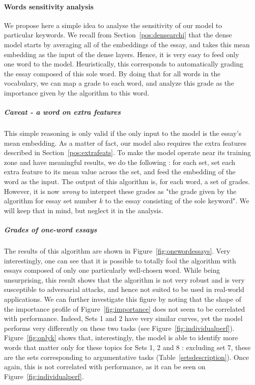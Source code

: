 \documentclass[a4paper,12pt,english]{article}
\begin{document}
\paragraph{Words sensitivity analysis} We propose here a simple idea to analyse the sensitivity of our model to particular keywords. We recall from Section~\ref{pos:densearchi} that the dense model starts by averaging all of the embeddings of the essay, and takes this mean embedding as the input of the dense layers. Hence, it is very easy to feed only one word to the model. Heuristically, this corresponds to automatically grading the essay composed of this sole word. By doing that for all words in the vocabulary, we can map a grade to each word, and analyze this grade as the importance given by the algorithm to this word.
\subparagraph{Caveat - a word on extra features} This simple reasoning is only valid if the only input to the model is the essay's mean embedding. As a matter of fact, our model also requires the extra features described in Section~\ref{pos:extrafeats}. To make the model operate near its training zone and have meaningful results, we do the following : for each set, set each extra feature to its mean value across the set, and feed the embedding of the word as the input. The output of this algorithm is, for each word, a set of grades. However, it is now \emph{wrong} to interpret these grades as "the grade given by the algorithm for essay set number $k$ to the essay consisting of the sole keyword". We will keep that in mind, but neglect it in the analysis.
\subparagraph{Grades of one-word essays} The results of this algorithm are shown in Figure~\ref{fig:onewordessays}. Very interestingly, one can see that it is possible to totally fool the algorithm with essays composed of only one particularly well-chosen word. While being unsurprising, this result shows that the algorithm is not very robust and is very susceptible to adversarial attacks, and hence not suited to be used in real-world applications.\newline
We can further investigate this figure by noting that the shape of the importance profile of Figure~\ref{fig:importance} does not seem to be correlated with performance. Indeed, Sets 1 and 2 have very similar curves, yet the model performs very differently on these two tasks (see Figure~\ref{fig:individualperf}). \newline
Figure~\ref{fig:onlyk} shows that, interestingly, the model is able to identify more words that matter only for these topics for Sets 1, 2 and 8 : excluding set 7, these are the sets corresponding to argumentative tasks (Table~\ref{setsdescription}). Once again, this is not correlated with performance, as it can be seen on Figure~\ref{fig:individualperf}.
\end{document}
